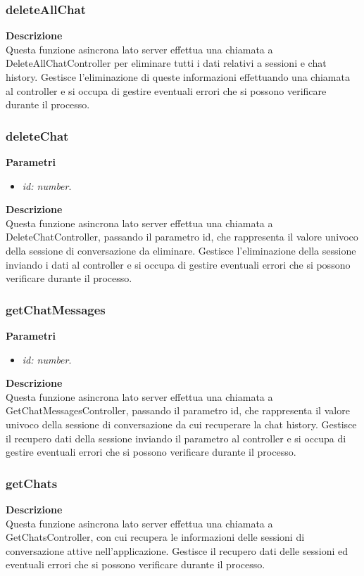 \subsubsection{deleteAllChat}
\textbf{Descrizione}\\
Questa funzione asincrona lato server effettua una chiamata a DeleteAllChatController per eliminare tutti i dati relativi a sessioni e chat history. Gestisce l'eliminazione di queste informazioni effettuando una chiamata al controller e si occupa di gestire eventuali errori che si possono verificare durante il processo.

\subsubsection{deleteChat}
\textbf{Parametri}
\begin{itemize}
    \item \textit{id: number}.
\end{itemize}
\textbf{Descrizione}\\
Questa funzione asincrona lato server effettua una chiamata a DeleteChatController, passando il parametro id, che rappresenta il valore univoco della sessione di conversazione da eliminare. Gestisce l'eliminazione della sessione inviando i dati al controller e si occupa di gestire eventuali errori che si possono verificare durante il processo.

\subsubsection{getChatMessages}
\textbf{Parametri}
\begin{itemize}
    \item \textit{id: number}.
\end{itemize}
\textbf{Descrizione}\\
Questa funzione asincrona lato server effettua una chiamata a GetChatMessagesController, passando il parametro id, che rappresenta il valore univoco della sessione di conversazione da cui recuperare la chat history. Gestisce il recupero dati della sessione inviando il parametro al controller e si occupa di gestire eventuali errori che si possono verificare durante il processo.

\subsubsection{getChats}
\textbf{Descrizione}\\
Questa funzione asincrona lato server effettua una chiamata a GetChatsController, con cui recupera le informazioni delle sessioni di conversazione attive nell'applicazione. Gestisce il recupero dati delle sessioni ed eventuali errori che si possono verificare durante il processo.

\newpage

\newpage
